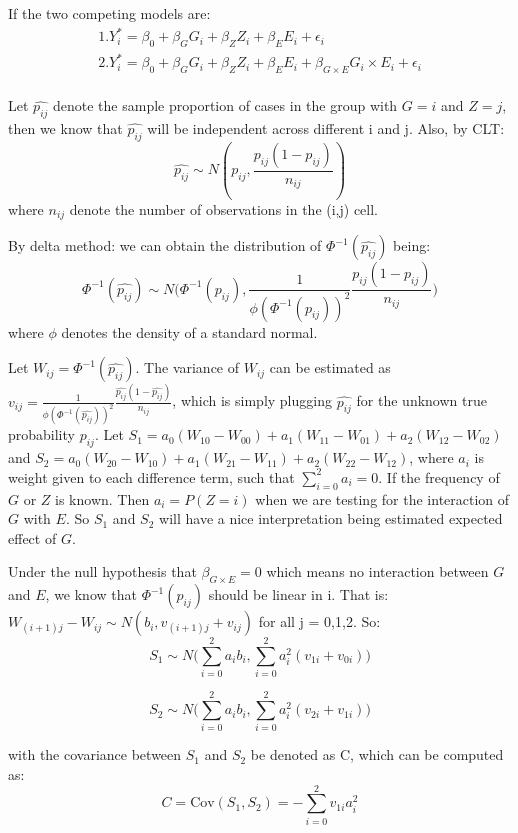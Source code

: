 \documentclass[
]{article}
\begin{document}
If the two competing models are: \begin{equation}
\begin{aligned}
1. Y_i ^{*} = \beta_0 + \beta_G G_i + \beta_Z Z_i + \beta_E E_i + \epsilon_i \\
2. Y_i ^{*} = \beta_0 + \beta_G G_i + \beta_Z Z_i + \beta_E E_i + \beta_{G\times E}G_i \times E_i + \epsilon_i \\
\end{aligned}
\end{equation}

Let \(\hat{p_{ij}}\) denote the sample proportion of cases in the group
with \(G = i\) and \(Z = j\), then we know that \(\hat{p_{ij}}\) will be
independent across different i and j. Also, by CLT:
\[\hat{p_{ij}} \sim N(p_{ij},\frac{p_{ij}(1-p_{ij})}{n_{ij}})\] where
\(n_{ij}\) denote the number of observations in the (i,j) cell.

By delta method: we can obtain the distribution of
\(\Phi^{-1}(\hat{p_{ij}})\) being:
\[\Phi^{-1}(\hat{p_{ij}}) \sim N\bigg(\Phi^{-1}(p_{ij}),\frac{1}{\phi(\Phi^{-1}(p_{ij}))^2}\frac{p_{ij}(1-p_{ij})}{n_{ij}}\bigg)\]
where \(\phi\) denotes the density of a standard normal.

Let \(W_{ij} = \Phi^{-1}(\hat{p_{ij}})\). The variance of \(W_{ij}\) can
be estimated as
\(v_{ij} = \frac{1}{\phi(\Phi^{-1}(\hat{p_{ij}}))^2}\frac{\hat{p_{ij}}(1-\hat{p_{ij}})}{n_{ij}}\),
which is simply plugging \(\hat{p_{ij}}\) for the unknown true
probability \(p_{ij}\). Let
\(S_1 = a_0(W_{10}-W_{00}) + a_1(W_{11}-W_{01}) + a_2(W_{12}-W_{02})\)
and
\(S_2 = a_0(W_{20}-W_{10}) + a_1(W_{21}-W_{11}) + a_2(W_{22}-W_{12})\),
where \(a_i\) is weight given to each difference term, such that
\(\sum_{i=0}^2 a_i =0\). If the frequency of \(G\) or \(Z\) is known.
Then \(a_i = P(Z =i)\) when we are testing for the interaction of \(G\)
with \(E\). So \(S_1\) and \(S_2\) will have a nice interpretation being
estimated expected effect of \(G\).

Under the null hypothesis that \(\beta_{G\times E} =0\) which means no
interaction between \(G\) and \(E\), we know that \(\Phi^{-1}(p_{ij})\)
should be linear in i. That is:
\(W_{(i+1)j} - W_{ij} \sim N(b_i,v_{(i+1)j} + v_{ij})\) for all j =
0,1,2. So:
\[S_1 \sim N\bigg(\sum_{i=0}^{2}a_ib_i,\sum_{i=0}^{2}a_i^2(v_{1i}+v_{0i})\bigg)\]

\[S_2 \sim N\bigg(\sum_{i=0}^{2}a_ib_i,\sum_{i=0}^{2}a_i^2(v_{2i}+v_{1i})\bigg)\]

with the covariance between \(S_1\) and \(S_2\) be denoted as C, which
can be computed as:
\[ C = \text{Cov}(S_1,S_2) = -\sum_{i=0}^{2}v_{1i}a_i^2 \]
\end{document}
